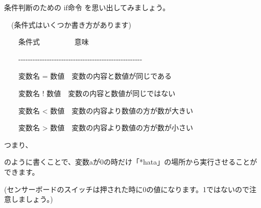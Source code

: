 条件判断のための if命令 を思い出してみましょう。


\begin{description}
    \item {}
    \item {}
    \item {}
    \item {}
\end{description}


\ \ (条件式はいくつか書き方があります)


\ \ \ \ 条件式 \ \ \ \ \ \ \ \ \ 意味

\ \ \ \ {}-{}-{}-{}-{}-{}-{}-{}-{}-{}-{}-{}-{}-{}-{}-{}-{}-{}-{}-{}-{}-{}-{}-{}-{}-{}-{}-{}-{}-{}-{}-{}-{}-{}-{}-{}-{}-{}-{}-{}-{}-{}-{}-{}-{}-{}-{}-{}-{}-{}-{}-{}-

\ \ \ \ 変数名 =
数値\ \ 変数の内容と数値が同じである

\ \ \ \ 変数名 !
数値\ \ 変数の内容と数値が同じではない

\ \ \ \ 変数名 {\textless}
数値\ \ 変数の内容より数値の方が数が大きい

\ \ \ \ 変数名 {\textgreater}
数値\ \ 変数の内容より数値の方が数が小さい


つまり、


\begin{description}
    \item {}
    \item {}
\end{description}


のように書くことで、変数aが0の時だけ「*hata」の場所から実行させることができます。

(センサーボードのスイッチは押された時に0の値になります。1ではないので注意しましょう。)










